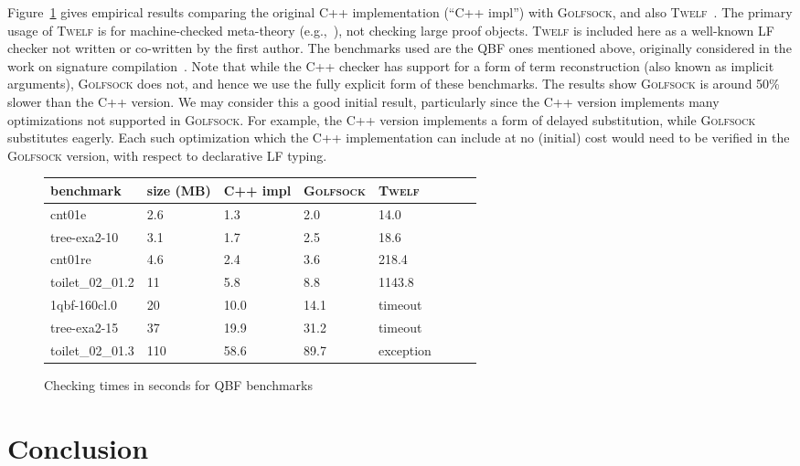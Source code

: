 \documentclass[preprint,natbib]{sigplanconf}
\begin{document}
Figure~\ref{fig:qbf} gives empirical results comparing the original
C++ implementation (``C++ impl'') with \textsc{Golfsock}, and also
\textsc{Twelf}~\cite{PfS98}.  The primary usage of \textsc{Twelf} is
for machine-checked meta-theory (e.g.,~\cite{lee+07}), not checking
large proof objects.  \textsc{Twelf} is included here as a well-known
LF checker not written or co-written by the first author.  The
benchmarks used are the QBF ones mentioned above, originally
considered in the work on signature compilation~\cite{zeller07}.
Note that while the C++ checker has support for a form of term
reconstruction (also known as implicit arguments), \textsc{Golfsock}
does not, and hence we use the fully explicit form of these
benchmarks.  The results show \textsc{Golfsock} is around 50\% slower
than the C++ version.  We may consider this a good initial result,
particularly since the C++ version implements many optimizations not
supported in \textsc{Golfsock}.  For example, the C++ version
implements a form of delayed substitution, while \textsc{Golfsock}
substitutes eagerly.  Each such optimization which the C++
implementation can include at no (initial) cost would need to be
verified in the \textsc{Golfsock} version, with respect to declarative
LF typing.

\begin{figure}
\footnotesize
\begin{center}
\begin{tabular}{|l|l|l|l|l|l|l|l|}
\hline
\textbf{benchmark} & \textbf{size (MB)} & C++ impl & \textsc{Golfsock} & \textsc{Twelf}
\\
\hline
cnt01e
&
2.6
&
1.3
&
2.0
&
14.0 
\\
tree-exa2-10
&
3.1
&
1.7
&
2.5
&
18.6
\\
cnt01re
&
4.6
&
2.4
&
3.6
&
218.4
\\
toilet\_02\_01.2
&
11
&
5.8
&
8.8
&
1143.8
\\
1qbf-160cl.0
&
20
&
10.0
&
14.1
&
timeout
\\
tree-exa2-15
&
37
&
19.9
&
31.2
&
timeout 
\\
toilet\_02\_01.3
&
110
&
58.6
&
89.7
&
exception 
\\
\hline
\end{tabular}
\end{center}
\caption{\label{fig:qbf}Checking times in seconds for QBF benchmarks}
\end{figure}

\section{Conclusion}
\end{document}
